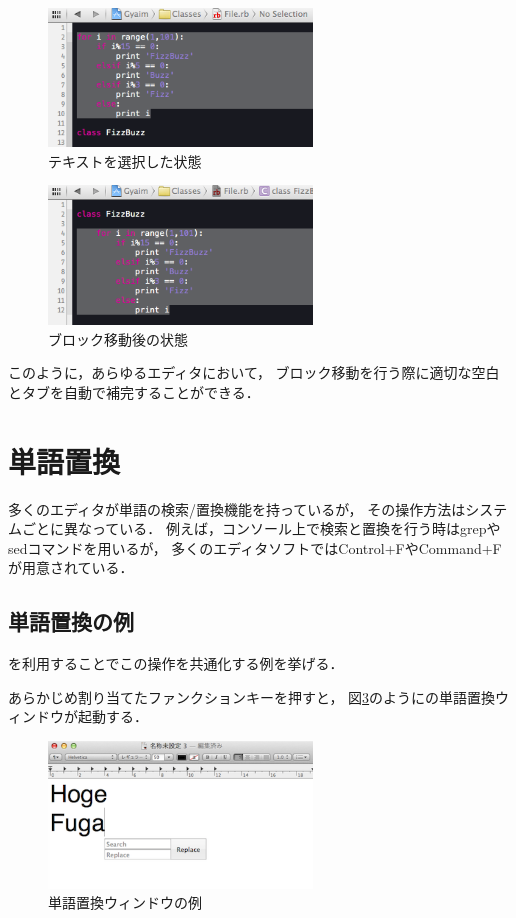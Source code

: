 \begin{figure}[H]
\centerline{\includegraphics[width=70mm,bb=0 0 360 190]{figures/indent2.png}}
\caption{テキストを選択した状態}
\label{indent2}
\end{figure}

\begin{figure}[H]
\centerline{\includegraphics[width=70mm,bb=0 0 360 190]{figures/indent3.png}}
\caption{ブロック移動後の状態}
\label{indent3}
\end{figure}

このように，あらゆるエディタにおいて，
ブロック移動を行う際に適切な空白とタブを自動で補完することができる．

\section{単語置換}

多くのエディタが単語の検索/置換機能を持っているが，
その操作方法はシステムごとに異なっている．
例えば，コンソール上で検索と置換を行う時はgrepやsedコマンドを用いるが，
多くのエディタソフトではControl+FやCommand+Fが用意されている．


\subsection{単語置換の例}
{\system}を利用することでこの操作を共通化する例を挙げる．

あらかじめ割り当てたファンクションキーを押すと，
図\ref{search1}のように{\system}の単語置換ウィンドウが起動する．

\begin{figure}[H]
\centerline{\includegraphics[width=70mm,bb=0 0 360 215]{figures/replace1.png}}
\caption{単語置換ウィンドウの例}
\label{search1}
\end{figure}

